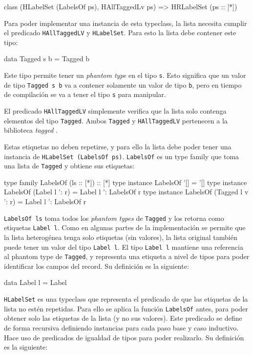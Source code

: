 \begin{code}
class (HLabelSet (LabelsOf ps), HAllTaggedLv ps) =>
  HRLabelSet (ps :: [*])
\end{code}

Para poder implementar una instancia de esta typeclass, la lista necesita cumplir el predicado \texttt{HAllTaggedLV} y \texttt{HLabelSet}. Para esto la lista debe contener este tipo:

\begin{code}
data Tagged s b = Tagged b
\end{code}

Este tipo permite tener un \textit{phantom type} en el tipo \texttt{s}. Esto significa que un valor de tipo \texttt{Tagged s b} va a contener solamente un valor de tipo \texttt{b}, pero en tiempo de compilación se va a tener el tipo \texttt{s} para manipular.

El predicado \texttt{HAllTaggedLV} simplemente verifica que la lista solo contenga elementos del tipo \texttt{Tagged}. Ambos \texttt{Tagged} y \texttt{HAllTaggedLV} pertenecen a la biblioteca \textit{tagged} \cite{HaskellTagged}.
 
Estas etiquetas no deben repetirse, y para ello la lista debe poder tener una instancia de \texttt{HLabelSet (LabelsOf ps)}. \texttt{LabelsOf} es un type family que toma una lista de \texttt{Tagged} y obtiene sus etiquetas:

\begin{code}
type family LabelsOf (ls :: [*]) :: [*]
type instance LabelsOf '[] = '[]
type instance LabelsOf (Label l ': r) = 
  Label l ': LabelsOf r
type instance LabelsOf (Tagged l v ': r) = 
  Label l ': LabelsOf r
\end{code}

\texttt{LabelsOf ls} toma todos los \textit{phantom types} de \texttt{Tagged} y los retorna como etiquetas \texttt{Label l}. Como en algunas partes de la implementación se permite que la lista heterogénea tenga solo etiquetas (sin valores), la lista original también puede tener un valor del tipo \texttt{Label l}. El tipo \texttt{Label l} mantiene una referencia al phantom type de \texttt{Tagged}, y representa una etiqueta a nivel de tipos para poder identificar los campos del record. Su definición es la siguiente:

\begin{code}
data Label l = Label
\end{code}

\texttt{HLabelSet} es una typeclass que representa el predicado de que las etiquetas de la lista no estén repetidas. Para ello se aplica la función \texttt{LabelsOf} antes, para poder obtener solo las etiquetas de la lista (y no sus valores). Este predicado se define de forma recursiva definiendo instancias para cada paso base y caso inductivo. Hace uso de predicados de igualdad de tipos para poder realizarlo. Su definición es la siguiente:

